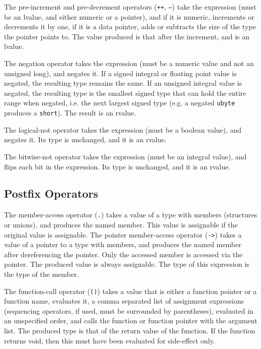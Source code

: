 \documentclass[letterpaper,12pt]{book}
\begin{document}
The pre-increment and pre-decrement operators (\texttt{++}, \texttt{--}) take the expression (must be an lvalue, and either numeric or a pointer), and if it is numeric, increments or decrements it by one, if it is a data pointer, adds or subtracts the size of the type the pointer points to. The value produced is that after the increment, and is an lvalue.

The negation operator takes the expression (must be a numeric value and not an unsigned long), and negates it. If a signed integral or floating point value is negated, the resulting type remains the same. If an unsigned integral value is negated, the resulting type is the smallest signed type that can hold the entire range when negated, i.e. the next largest signed type (e.g. a negated \texttt{ubyte} produces a \texttt{short}). The result is an rvalue.

The logical-not operator takes the expression (must be a boolean value), and negates it. Its type is unchanged, and it is an rvalue.

The bitwise-not operator takes the expression (must be an integral value), and flips each bit in the expression. Its type is unchanged, and it is an rvalue.

\subsection{Postfix Operators}



The member-access operator (\texttt{.}) takes a value of a type with members (structures or unions), and produces the named member. This value is assignable if the original value is assignable. The pointer member-access operator (\texttt{->}) takes a value of a pointer to a type with members, and produces the named member after dereferencing the pointer. Only the accessed member is accessed via the pointer. The produced value is always assignable. The type of this expression is the type of the member.

The function-call operator (\texttt{()}) takes a value that is either a function pointer or a function name, evaluates it, a comma separated list of assignment expressions (sequencing operators, if used, must be surrounded by parentheses), evaluated in an unspecified order, and calls the function or function pointer with the argument list. The produced type is that of the return value of the function. If the function returns void, then this must have been evaluated for side-effect only.
\end{document}
